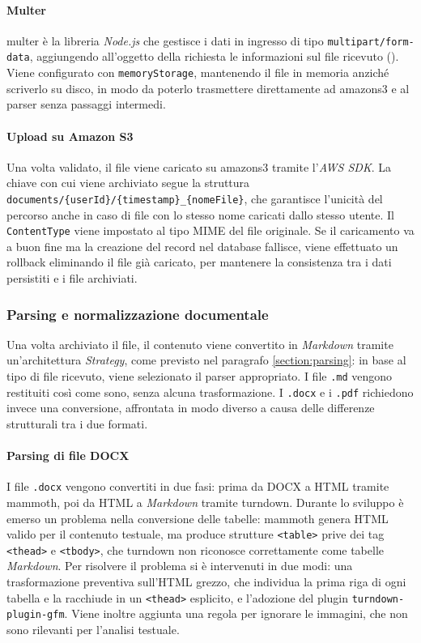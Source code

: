 \paragraph{Multer}
\gls{multer} è la libreria \emph{Node.js} che gestisce i dati in ingresso di tipo \texttt{multipart/form-data}, aggiungendo all'oggetto della richiesta le informazioni sul file ricevuto (\cite{site:multer}). Viene configurato con \texttt{memoryStorage}, mantenendo il file in memoria anziché scriverlo su disco, in modo da poterlo trasmettere direttamente ad \gls{amazons3} e al parser senza passaggi intermedi.

\paragraph{Upload su Amazon S3}
Una volta validato, il file viene caricato su \gls{amazons3} tramite l'\emph{AWS SDK}. La chiave con cui viene archiviato segue la struttura \texttt{documents/\{userId\}/\{timestamp\}\_\{nomeFile\}}, che garantisce l'unicità del percorso anche in caso di file con lo stesso nome caricati dallo stesso utente. Il \texttt{ContentType} viene impostato al tipo MIME del file originale. Se il caricamento va a buon fine ma la creazione del record nel database fallisce, viene effettuato un rollback eliminando il file già caricato, per mantenere la consistenza tra i dati persistiti e i file archiviati.

\subsubsection{Parsing e normalizzazione documentale}
Una volta archiviato il file, il contenuto viene convertito in \emph{Markdown} tramite un'architettura \emph{Strategy}, come previsto nel paragrafo \ref{section:parsing}: in base al tipo di file ricevuto, viene selezionato il parser appropriato. I file \texttt{.md} vengono restituiti così come sono, senza alcuna trasformazione. I \texttt{.docx} e i \texttt{.pdf} richiedono invece una conversione, affrontata in modo diverso a causa delle differenze strutturali tra i due formati.

\paragraph{Parsing di file DOCX}
I file \texttt{.docx} vengono convertiti in due fasi: prima da DOCX a HTML tramite \gls{mammoth}, poi da HTML a \emph{Markdown} tramite \gls{turndown}. Durante lo sviluppo è emerso un problema nella conversione delle tabelle: \gls{mammoth} genera HTML valido per il contenuto testuale, ma produce strutture \texttt{<table>} prive dei tag \texttt{<thead>} e \texttt{<tbody>}, che \gls{turndown} non riconosce correttamente come tabelle \emph{Markdown}. Per risolvere il problema si è intervenuti in due modi: una trasformazione preventiva sull'HTML grezzo, che individua la prima riga di ogni tabella e la racchiude in un \texttt{<thead>} esplicito, e l'adozione del plugin \texttt{turndown-plugin-gfm}. Viene inoltre aggiunta una regola per ignorare le immagini, che non sono rilevanti per l'analisi testuale.\\

